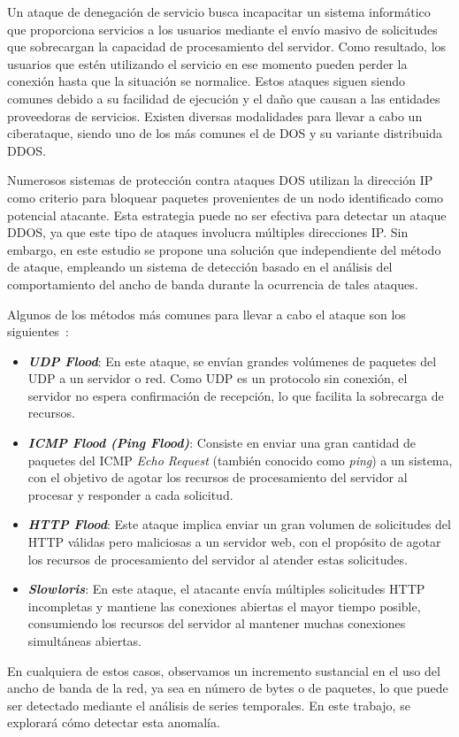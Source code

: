 Un ataque de denegación de servicio busca incapacitar un sistema informático que proporciona servicios a los usuarios mediante el envío masivo de solicitudes que sobrecargan la capacidad de procesamiento del servidor. Como resultado, los usuarios que estén utilizando el servicio en ese momento pueden perder la conexión hasta que la situación se normalice. Estos ataques siguen siendo comunes debido a su facilidad de ejecución y el daño que causan a las entidades proveedoras de servicios. Existen diversas modalidades para llevar a cabo un ciberataque, siendo uno de los más comunes el de \ac{DOS} y su variante distribuida \ac{DDOS}.

Numerosos sistemas de protección contra ataques \ac{DOS} utilizan la dirección IP como criterio para bloquear paquetes provenientes de un nodo identificado como potencial atacante. Esta estrategia puede no ser efectiva para detectar un ataque \ac{DDOS}, ya que este tipo de ataques involucra múltiples direcciones IP. Sin embargo, en este estudio se propone una solución que independiente del método de ataque, empleando un sistema de detección basado en el análisis del comportamiento del ancho de banda durante la ocurrencia de tales ataques.

Algunos de los métodos más comunes para llevar a cabo el ataque son los siguientes~\cite{bhosale2017distributed}:
\begin{itemize}
    \item \textbf{\textit{UDP Flood}}: En este ataque, se envían grandes volúmenes de paquetes del \ac{UDP} a un servidor o red. Como \ac{UDP} es un protocolo sin conexión, el servidor no espera confirmación de recepción, lo que facilita la sobrecarga de recursos.
    
    \item \textbf{\textit{ICMP Flood (Ping Flood)}}: Consiste en enviar una gran cantidad de paquetes del \ac{ICMP} \textit{Echo Request} (también conocido como \textit{ping}) a un sistema, con el objetivo de agotar los recursos de procesamiento del servidor al procesar y responder a cada solicitud.
    
    \item \textbf{\textit{HTTP Flood}}: Este ataque implica enviar un gran volumen de solicitudes del \ac{HTTP} válidas pero maliciosas a un servidor web, con el propósito de agotar los recursos de procesamiento del servidor al atender estas solicitudes.
    
    \item \textbf{\textit{Slowloris}}: En este ataque, el atacante envía múltiples solicitudes \ac{HTTP} incompletas y mantiene las conexiones abiertas el mayor tiempo posible, consumiendo los recursos del servidor al mantener muchas conexiones simultáneas abiertas.
\end{itemize}
En cualquiera de estos casos, observamos un incremento sustancial en el uso del ancho de banda de la red, ya sea en número de bytes o de paquetes, lo que puede ser detectado mediante el análisis de series temporales.
En este trabajo, se explorará cómo detectar esta anomalía.